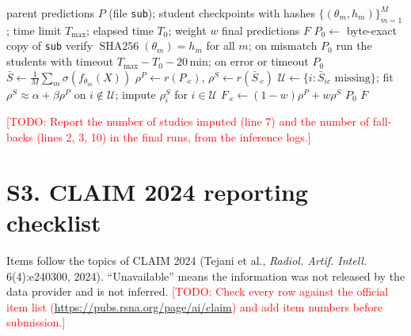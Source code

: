 \documentclass[10pt]{article}
\newcommand{\TODO}[1]{\textcolor{red}{[TODO: #1]}}
\begin{document}
\begin{algorithm}[h]
\caption{Rank fusion with fall-back to the parent predictions}
\label{alg:fusion}
\begin{algorithmic}[1]
\Require parent predictions $P$ (file \texttt{sub}); student checkpoints with hashes $\{(\theta_m,h_m)\}_{m=1}^{M}$;
time limit $T_{\max}$; elapsed time $T_0$; weight $w$
\Ensure final predictions $F$
\State $P_0\gets$ byte-exact copy of \texttt{sub}
\State verify $\operatorname{SHA256}(\theta_m)=h_m$ for all $m$; on mismatch \Return $P_0$
\State run the students with timeout $T_{\max}-T_0-20\,\text{min}$; on error or timeout \Return $P_0$
\State $\bar S\gets\frac{1}{M}\sum_m\sigma(f_{\theta_m}(X))$
  \State $\rho^P\gets r(P_{\cdot c})$, $\rho^S\gets r(\bar S_{\cdot c})$
  \State $\mathcal{U}\gets\{i:\bar S_{ic}\text{ missing}\}$; fit $\rho^S\approx\alpha+\beta\rho^P$ on $i\notin\mathcal{U}$; impute $\rho^S_i$ for $i\in\mathcal{U}$
  \State $F_{\cdot c}\gets(1-w)\rho^P+w\rho^S$
\EndFor
{} \Return $P_0$ \EndIf
\State \Return $F$
\end{algorithmic}
\end{algorithm}

\TODO{Report the number of studies imputed (line 7) and the number of fall-backs (lines 2, 3, 10) in the final runs, from
the inference logs.}

\section*{S3. CLAIM 2024 reporting checklist}
Items follow the topics of CLAIM 2024 (Tejani et al., \emph{Radiol. Artif. Intell.} 6(4):e240300, 2024). ``Unavailable''
means the information was not released by the data provider and is not inferred. \TODO{Check every row against the
official item list (\url{https://pubs.rsna.org/page/ai/claim}) and add item numbers before submission.}
\end{document}
